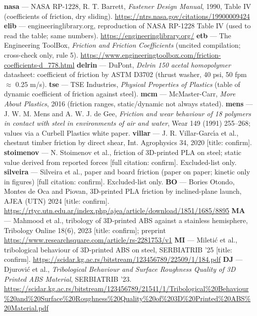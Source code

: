  \textbf{nasa} --- NASA RP-1228, R. T. Barrett, \emph{Fastener Design Manual}, 1990, Table IV (coefficients of friction, dry sliding). \url{https://ntrs.nasa.gov/citations/19900009424}
 \textbf{elib} --- engineeringlibrary.org, reproduction of NASA RP-1228 Table IV (used to read the table; same numbers). \url{https://engineeringlibrary.org/}
 \textbf{etb} --- The Engineering ToolBox, \emph{Friction and Friction Coefficients} (uncited compilation; cross-check only, rule 5). \url{https://www.engineeringtoolbox.com/friction-coefficients-d_778.html}
 \textbf{delrin} --- DuPont, \emph{Delrin 150 acetal homopolymer} datasheet: coefficient of friction by ASTM D3702 (thrust washer, 40 psi, 50 fpm $\approx$ 0.25 m/s).
 \textbf{tse} --- TSE Industries, \emph{Physical Properties of Plastics} (table of dynamic coefficient of friction against steel).
 \textbf{mcm} --- McMaster-Carr, \emph{More About Plastics}, 2016 (friction ranges, static/dynamic not always stated).
 \textbf{mens} --- J. W. M. Mens and A. W. J. de Gee, \emph{Friction and wear behaviour of 18 polymers in contact with steel in environments of air and water}, Wear 149 (1991) 255--268; values via a Curbell Plastics white paper.
 \textbf{villar} --- J. R. Villar-Garc\'{\i}a et al., chestnut timber friction by direct shear, Int. Agrophysics 34, 2020 [title: confirm].
 \textbf{stoimenov} --- N. Stoimenov et al., friction of 3D-printed PLA on steel; static value derived from reported forces [full citation: confirm]. Excluded-list only.
 \textbf{silveira} --- Silveira et al., paper and board friction (paper on paper; kinetic only in figures) [full citation: confirm]. Excluded-list only.
 \textbf{BO} --- Bories Otondo, Montes de Oca and Piovan, 3D-printed PLA friction by inclined-plane launch, AJEA (UTN) 2024 [title: confirm]. \url{https://rtyc.utn.edu.ar/index.php/ajea/article/download/1851/1685/8895}
 \textbf{MA} --- Mahmood et al., tribology of 3D-printed ABS against a stainless hemisphere, Tribology Online 18(6), 2023 [title: confirm]; preprint \url{https://www.researchsquare.com/article/rs-2281753/v1}
 \textbf{MI} --- Mileti\'c et al., tribological behaviour of 3D-printed ABS on steel, SERBIATRIB '25 [title: confirm]. \url{https://scidar.kg.ac.rs/bitstream/123456789/22509/1/184.pdf}
 \textbf{DJ} --- Djurovi\'c et al., \emph{Tribological Behaviour and Surface Roughness Quality of 3D Printed ABS Material}, SERBIATRIB '23. \url{https://scidar.kg.ac.rs/bitstream/123456789/21541/1/Tribological%20Behaviour%20and%20Surface%20Roughness%20Quality%20of%203D%20Printed%20ABS%20Material.pdf}
